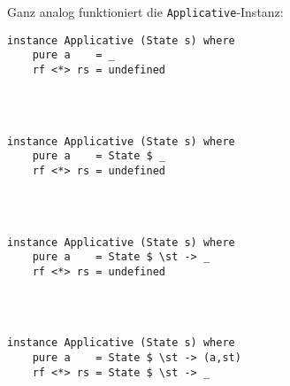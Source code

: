 \documentclass{beamer}
\begin{document}
\begin{frame}[fragile]
Ganz analog funktioniert die \texttt{Applicative}-Instanz:
\begin{overprint}
\begin{verbatim}
instance Applicative (State s) where
    pure a    = _
    rf <*> rs = undefined

    
    
\end{verbatim}
\begin{verbatim}
instance Applicative (State s) where
    pure a    = State $ _
    rf <*> rs = undefined

    
    
\end{verbatim}
\begin{verbatim}
instance Applicative (State s) where
    pure a    = State $ \st -> _
    rf <*> rs = undefined

    
    
\end{verbatim}
\begin{verbatim}
instance Applicative (State s) where
    pure a    = State $ \st -> (a,st)
    rf <*> rs = State $ \st -> _

    
    

\end{verbatim}
\end{overprint}
\end{frame}
\end{document}
